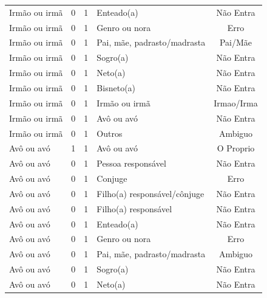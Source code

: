 \documentclass[
	12pt,				%
	openright,			%
	twoside,			%
	a4paper,			%
	english,			%
	french,				%
	spanish,			%
	brazil				%
	]{abntex2}
\begin{document}
\begin{anexosenv}
\begin{longtable}{@{}lcclc@{}}
Irmão ou irmã                & 0         & 1        & Enteado(a)                   & Não Entra       \\
Irmão ou irmã                & 0         & 1        & Genro ou nora                & Erro            \\
Irmão ou irmã                & 0         & 1        & Pai, mãe, padrasto/madrasta  & Pai/Mãe         \\
Irmão ou irmã                & 0         & 1        & Sogro(a)                     & Não Entra       \\
Irmão ou irmã                & 0         & 1        & Neto(a)                      & Não Entra       \\
Irmão ou irmã                & 0         & 1        & Bisneto(a)                   & Não Entra       \\
Irmão ou irmã                & 0         & 1        & Irmão ou irmã                & Irmao/Irma      \\
Irmão ou irmã                & 0         & 1        & Avô ou avó                   & Não Entra       \\
Irmão ou irmã                & 0         & 1        & Outros                       & Ambiguo         \\
Avô ou avó                   & 1         & 1        & Avô ou avó                   & O Proprio       \\
Avô ou avó                   & 0         & 1        & Pessoa responsável           & Não Entra       \\
Avô ou avó                   & 0         & 1        & Conjuge                      & Erro            \\
Avô ou avó                   & 0         & 1        & Filho(a) responsável/cônjuge & Não Entra       \\
Avô ou avó                   & 0         & 1        & Filho(a) responsável         & Não Entra       \\
Avô ou avó                   & 0         & 1        & Enteado(a)                   & Não Entra       \\
Avô ou avó                   & 0         & 1        & Genro ou nora                & Erro            \\
Avô ou avó                   & 0         & 1        & Pai, mãe, padrasto/madrasta  & Ambiguo         \\
Avô ou avó                   & 0         & 1        & Sogro(a)                     & Não Entra       \\
Avô ou avó                   & 0         & 1        & Neto(a)                      & Não Entra       \\

\end{longtable}
\end{anexosenv}
\end{document}

